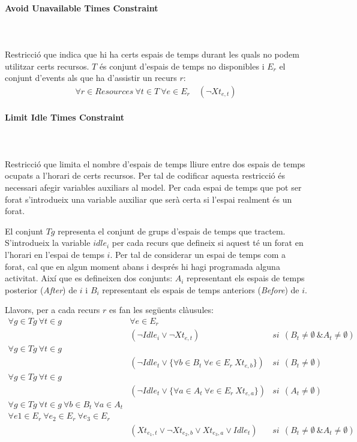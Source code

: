 \documentclass[11pt,a4paper,twoside]{report}
\begin{document}
  \paragraph*{Avoid Unavailable Times Constraint} ~\\~\\

  Restricció que indica que hi ha certs espais de temps durant les quals no podem utilitzar certs recursos. $T$ és conjunt d'espais de temps no disponibles i $E_r$ el conjunt d'events als que ha d'assistir un recurs $r$:
  \begin{align*}
    \forall r \in Resources \ \forall t \in T \ \forall e \in E_r \quad
    (\neg Xt_{e,t})
  \end{align*}
    
    
  \paragraph*{Limit Idle Times Constraint} ~\\~\\

  Restricció que limita el nombre d'espais de temps lliure entre dos espais de temps ocupats a l'horari de certs recursos. 
  Per tal de codificar aquesta restricció és necessari afegir variables auxiliars al model. Per cada espai de temps que pot ser forat s'introdueix una variable auxiliar que serà certa si l'espai realment és un forat.

  El conjunt $Tg$ representa el conjunt de grups d'espais de temps que tractem. 
  S'introdueix la variable $idle_i$ per cada recurs que defineix si aquest té un forat en l'horari en l'espai de temps $i$. Per tal de considerar un espai de temps com a forat, cal que en algun moment abans i després hi hagi programada alguna activitat.
   Així que es defineixen dos conjunts: $A_i$ representant els espais de temps posterior (\textit{After}) de $i$ i $B_i$ representant els espais de temps anteriors (\textit{Before}) de $i$.
   
   Llavors, per a cada recurs $r$ es fan les següents clàusules:
   \begin{align*}
    \forall g \in Tg \ \forall t \in g \ &\forall e \in E_r \\
    &(\neg Idle_i \lor \neg Xt_{e, t}) & si \ \ (B_t \neq \emptyset \ \& A_t \neq \emptyset) \\
    \forall g \in Tg \ \forall t \in g  \ & \\
    & (\neg Idle_t \lor \{\forall b \in B_t \ \forall e \in E_r \ Xt_{e,b}\}) & si \ \ (B_t \neq \emptyset)\\
    \forall g \in Tg \ \forall t \in g & \\
    & (\neg Idle_t \lor \{\forall a \in A_t \ \forall e \in E_r \ Xt_{e,a}\}) & si \ \ (A_t \neq \emptyset)\\
    \forall g \in Tg \ \forall t \in g \ \forall b \in B_t \ \forall a \in A_t & \\
    \forall e1 \in E_r \ \forall e_2 \in E_r \ \forall e_3 \in E_r & \\
    & (Xt_{e_{1}, t} \lor \neg Xt_{e_2, b} \lor Xt_{e_3, a} \lor Idle_t) & si \ \ (B_t \neq \emptyset \ \& A_t \neq \emptyset)
   \end{align*}
\end{document}
